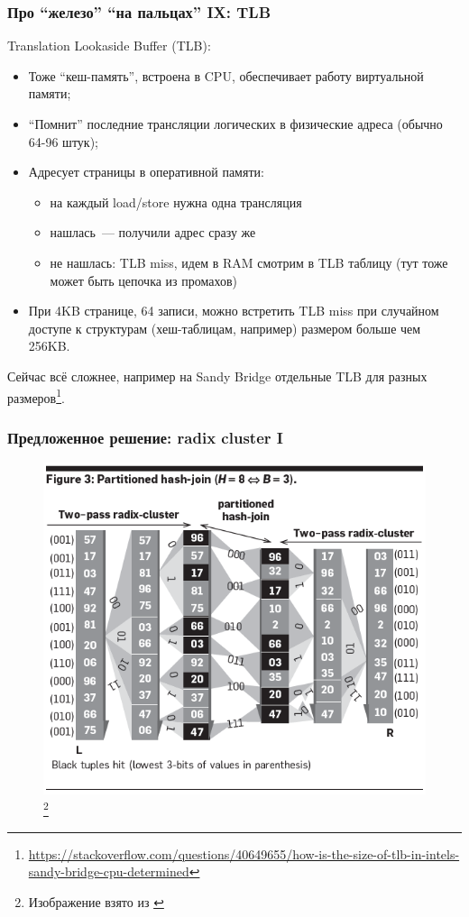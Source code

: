 \documentclass{beamer}
\begin{document}
\begin{frame}
\frametitle{Про ``железо'' ``на пальцах'' IX: TLB}

Translation Lookaside Buffer (TLB):
\begin{itemize}
  \item Тоже ``кеш-память'', встроена в CPU, обеспечивает работу виртуальной памяти;
  \item ``Помнит'' последние трансляции логических в физические адреса (обычно 64-96 штук);
  \item Адресует страницы в оперативной памяти:
  \begin{itemize}
    \item на каждый load/store нужна одна трансляция
    \item нашлась~--- получили адрес сразу же
    \item не нашлась: TLB miss, идем в RAM смотрим в TLB таблицу (тут тоже может быть цепочка из промахов)
  \end{itemize}
  \item При 4KB странице, 64 записи, можно встретить TLB miss при случайном доступе к структурам (хеш-таблицам, например) размером больше чем 256KB.  
\end{itemize}

Сейчас всё сложнее, например на Sandy Bridge отдельные TLB для разных размеров\footnote{\url{https://stackoverflow.com/questions/40649655/how-is-the-size-of-tlb-in-intels-sandy-bridge-cpu-determined}}.

\end{frame}


\begin{frame}
\frametitle{Предложенное решение: radix cluster I}

\begin{figure}[htb]
\includegraphics[width=\textwidth,height=0.750\textheight,keepaspectratio]{phjoin.png} 
\footnote{\tiny{Изображение взято из \cite{Boncz2008}}}
\end{figure}

\end{frame}
\end{document}
